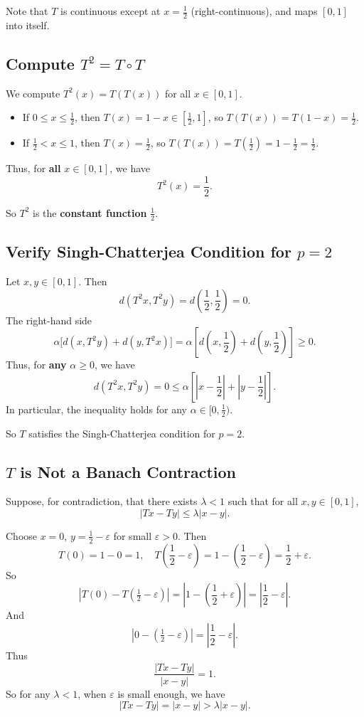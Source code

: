 \documentclass[12pt]{article}
\begin{document}
Note that $ T $ is continuous except at $ x = \frac{1}{2} $ (right-continuous), and maps $ [0,1] $ into itself.

\subsection*{Compute $ T^2 = T \circ T $}

We compute $ T^2(x) = T(T(x)) $ for all $ x \in [0,1] $.
\begin{itemize}
\item If $ 0 \leq x \leq \frac{1}{2} $, then $ T(x) = 1 - x \in [\frac{1}{2}, 1] $, so $ T(T(x)) = T(1 - x) = \frac{1}{2} $.
    \item If $ \frac{1}{2} < x \leq 1 $, then $ T(x) = \frac{1}{2} $, so $ T(T(x)) = T(\frac{1}{2}) = 1 - \frac{1}{2} = \frac{1}{2} $.
\end{itemize}
Thus, for \textbf{all} $ x \in [0,1] $, we have
\[
T^2(x) = \frac{1}{2}.
\]

So $ T^2 $ is the \textbf{constant function} $ \frac{1}{2} $.

\subsection*{Verify Singh-Chatterjea Condition for $ p = 2 $}

Let $ x, y \in [0,1] $. Then
\[
d(T^2 x, T^2 y) = d\left(\frac{1}{2}, \frac{1}{2}\right) = 0.
\]
The right-hand side
\[
\alpha \big[ d(x, T^2 y) + d(y, T^2 x) \big] = \alpha \left[ d\left(x, \frac{1}{2}\right) + d\left(y, \frac{1}{2}\right) \right] \geq 0.
\]
Thus, for \textbf{any} $ \alpha \geq 0 $, we have
\[
d(T^2 x, T^2 y) = 0 \leq \alpha \left[ \left|x - \frac{1}{2}\right| + \left|y - \frac{1}{2}\right| \right].
\]
In particular, the inequality holds for any $ \alpha \in [0, \tfrac{1}{2}) $.

 So $ T $ satisfies the Singh-Chatterjea condition for $ p = 2 $.

\subsection*{$ T $ is Not a Banach Contraction}

Suppose, for contradiction, that there exists $ \lambda < 1 $ such that for all $ x, y \in [0,1] $,
\[
|Tx - Ty| \leq \lambda |x - y|.
\]

Choose $ x = 0 $, $ y = \frac{1}{2} - \varepsilon $ for small $ \varepsilon > 0 $. Then
\[
T(0) = 1 - 0 = 1, \quad T\left(\frac{1}{2} - \varepsilon\right) = 1 - \left(\frac{1}{2} - \varepsilon\right) = \frac{1}{2} + \varepsilon.
\]
So
\[
|T(0) - T(\tfrac{1}{2} - \varepsilon)| = \left|1 - \left(\frac{1}{2} + \varepsilon\right)\right| = \left|\frac{1}{2} - \varepsilon\right|.
\]
And
\[
|0 - (\tfrac{1}{2} - \varepsilon)| = \left|\frac{1}{2} - \varepsilon\right|.
\]
Thus
\[
\frac{|Tx - Ty|}{|x - y|} = 1.
\]
So for any $ \lambda < 1 $, when $ \varepsilon $ is small enough, we have
\[
|Tx - Ty| = |x - y| > \lambda |x - y|.
\]
\end{document}
